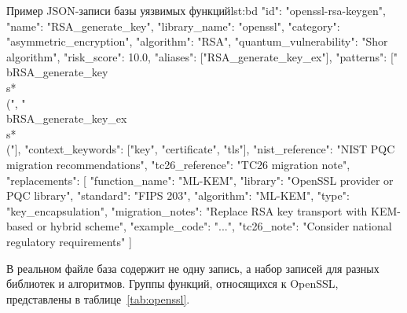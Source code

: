 \documentclass{itmo-vkr}
\begin{document}
\begin{itmolisting}[JSON]{Пример JSON-записи базы уязвимых функций}{lst:bd}
{
	"id": "openssl-rsa-keygen",
	"name": "RSA_generate_key",
	"library_name": "openssl",
	"category": "asymmetric_encryption",
	"algorithm": "RSA",
	"quantum_vulnerability": "Shor algorithm",
	"risk_score": 10.0,
	"aliases": ["RSA_generate_key_ex"],
	"patterns": ["\\bRSA_generate_key\\s*\\(", "\\bRSA_generate_key_ex\\s*\\("],
	"context_keywords": ["key", "certificate", "tls"],
	"nist_reference": "NIST PQC migration recommendations",
	"tc26_reference": "TC26 migration note",
	"replacements": [
	{
		"function_name": "ML-KEM",
		"library": "OpenSSL provider or PQC library",
		"standard": "FIPS 203",
		"algorithm": "ML-KEM",
		"type": "key_encapsulation",
		"migration_notes": "Replace RSA key transport with KEM-based or hybrid scheme",
		"example_code": "...",
		"tc26_note": "Consider national regulatory requirements"
	}
	]
}
\end{itmolisting}

В реальном файле база содержит не одну запись, а набор записей для разных библиотек и алгоритмов. Группы функций, относящихся к OpenSSL, представлены в таблице~\ref{tab:openssl}.
\end{document}

